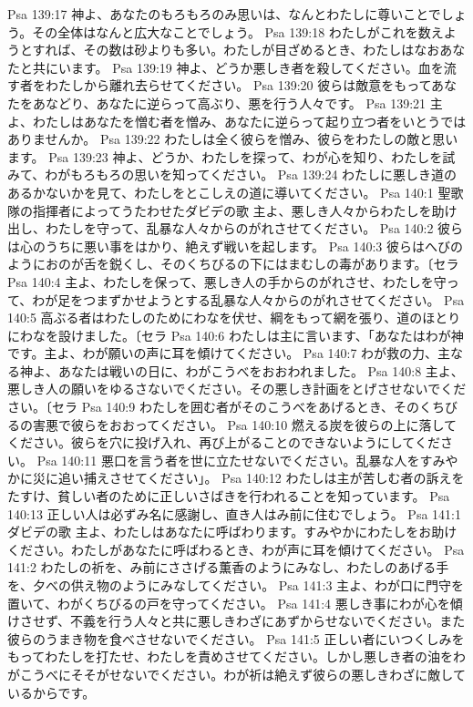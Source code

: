 Psa 139:17  神よ、あなたのもろもろのみ思いは、なんとわたしに尊いことでしょう。その全体はなんと広大なことでしょう。
Psa 139:18  わたしがこれを数えようとすれば、その数は砂よりも多い。わたしが目ざめるとき、わたしはなおあなたと共にいます。
Psa 139:19  神よ、どうか悪しき者を殺してください。血を流す者をわたしから離れ去らせてください。
Psa 139:20  彼らは敵意をもってあなたをあなどり、あなたに逆らって高ぶり、悪を行う人々です。
Psa 139:21  主よ、わたしはあなたを憎む者を憎み、あなたに逆らって起り立つ者をいとうではありませんか。
Psa 139:22  わたしは全く彼らを憎み、彼らをわたしの敵と思います。
Psa 139:23  神よ、どうか、わたしを探って、わが心を知り、わたしを試みて、わがもろもろの思いを知ってください。
Psa 139:24  わたしに悪しき道のあるかないかを見て、わたしをとこしえの道に導いてください。
Psa 140:1  聖歌隊の指揮者によってうたわせたダビデの歌 主よ、悪しき人々からわたしを助け出し、わたしを守って、乱暴な人々からのがれさせてください。
Psa 140:2  彼らは心のうちに悪い事をはかり、絶えず戦いを起します。
Psa 140:3  彼らはへびのようにおのが舌を鋭くし、そのくちびるの下にはまむしの毒があります。〔セラ
Psa 140:4  主よ、わたしを保って、悪しき人の手からのがれさせ、わたしを守って、わが足をつまずかせようとする乱暴な人々からのがれさせてください。
Psa 140:5  高ぶる者はわたしのためにわなを伏せ、綱をもって網を張り、道のほとりにわなを設けました。〔セラ
Psa 140:6  わたしは主に言います、「あなたはわが神です。主よ、わが願いの声に耳を傾けてください。
Psa 140:7  わが救の力、主なる神よ、あなたは戦いの日に、わがこうべをおおわれました。
Psa 140:8  主よ、悪しき人の願いをゆるさないでください。その悪しき計画をとげさせないでください。〔セラ
Psa 140:9  わたしを囲む者がそのこうべをあげるとき、そのくちびるの害悪で彼らをおおってください。
Psa 140:10  燃える炭を彼らの上に落してください。彼らを穴に投げ入れ、再び上がることのできないようにしてください。
Psa 140:11  悪口を言う者を世に立たせないでください。乱暴な人をすみやかに災に追い捕えさせてください」。
Psa 140:12  わたしは主が苦しむ者の訴えをたすけ、貧しい者のために正しいさばきを行われることを知っています。
Psa 140:13  正しい人は必ずみ名に感謝し、直き人はみ前に住むでしょう。
Psa 141:1  ダビデの歌 主よ、わたしはあなたに呼ばわります。すみやかにわたしをお助けください。わたしがあなたに呼ばわるとき、わが声に耳を傾けてください。
Psa 141:2  わたしの祈を、み前にささげる薫香のようにみなし、わたしのあげる手を、夕べの供え物のようにみなしてください。
Psa 141:3  主よ、わが口に門守を置いて、わがくちびるの戸を守ってください。
Psa 141:4  悪しき事にわが心を傾けさせず、不義を行う人々と共に悪しきわざにあずからせないでください。また彼らのうまき物を食べさせないでください。
Psa 141:5  正しい者にいつくしみをもってわたしを打たせ、わたしを責めさせてください。しかし悪しき者の油をわがこうべにそそがせないでください。わが祈は絶えず彼らの悪しきわざに敵しているからです。
